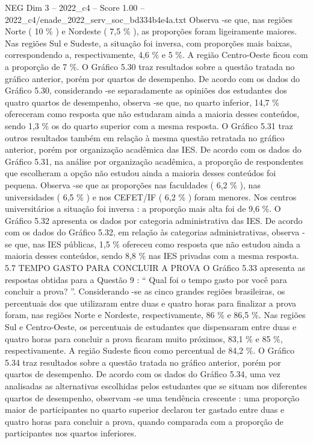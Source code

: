 \begin{textsample}{NEG Dim 3 – 2022\_c4 – Score 1.00 – 2022\_c4/enade\_2022\_serv\_soc\_bd334b4e4a.txt}
Observa -se que, nas regiões Norte ( 10 \% ) e Nordeste ( 7,5 \% ), as proporções foram ligeiramente maiores.
Nas regiões Sul e Sudeste, a situação foi inversa, com proporções mais baixas, correspondendo a, respectivamente, 4,6 \% e 5 \%.
A região Centro-Oeste ficou com a proporção de 7 \%.
O Gráfico 5.30 traz resultados sobre a questão tratada no gráfico anterior, porém por quartos de desempenho.
De acordo com os dados do Gráfico 5.30, considerando -se separadamente as opiniões dos estudantes dos quatro quartos de desempenho, observa -se que, no quarto inferior, 14,7 \% ofereceram como resposta que não estudaram ainda a maioria desses conteúdos, sendo 1,3 \% os do quarto superior com a mesma resposta.
O Gráfico 5.31 traz outros resultados também em relação à mesma questão retratada no gráfico anterior, porém por organização acadêmica das IES.
De acordo com os dados do Gráfico 5.31, na análise por organização acadêmica, a proporção de respondentes que escolheram a opção não estudou ainda a maioria desses conteúdos foi pequena.
Observa -se que as proporções nas faculdades ( 6,2 \% ), nas universidades ( 6,5 \% ) e nos CEFET/IF ( 6,2 \% ) foram menores.
Nos centros universitários a situação foi inversa : a proporção mais alta foi de 9,6 \%.
O Gráfico 5.32 apresenta os dados por categoria administrativa das IES.
De acordo com os dados do Gráfico 5.32, em relação às categorias administrativas, observa -se que, nas IES públicas, 1,5 \% ofereceu como resposta que não estudou ainda a maioria desses conteúdos, sendo 8,8 \% nas IES privadas com a mesma resposta. 5.7 TEMPO GASTO PARA CONCLUIR A PROVA O Gráfico 5.33 apresenta as respostas obtidas para a Questão 9 : “ Qual foi o tempo gasto por você para concluir a prova? ”.
Considerando -se as cinco grandes regiões brasileiras, os percentuais dos que utilizaram entre duas e quatro horas para finalizar a prova foram, nas regiões Norte e Nordeste, respectivamente, 86 \% e 86,5 \%.
Nas regiões Sul e Centro-Oeste, os percentuais de estudantes que dispensaram entre duas e quatro horas para concluir a prova ficaram muito próximos, 83,1 \% e 85 \%, respectivamente.
A região Sudeste ficou como percentual de 84,2 \%.
O Gráfico 5.34 traz resultados sobre a questão tratada no gráfico anterior, porém por quartos de desempenho.
De acordo com os dados do Gráfico 5.34, uma vez analisadas as alternativas escolhidas pelos estudantes que se situam nos diferentes quartos de desempenho, observam -se uma tendência crescente : uma proporção maior de participantes no quarto superior declarou ter gastado entre duas e quatro horas para concluir a prova, quando comparada com a proporção de participantes nos quartos inferiores.

\end{textsample}
